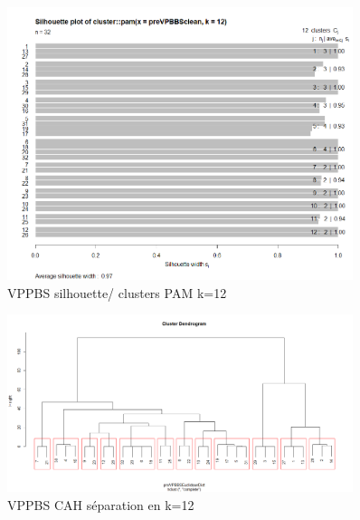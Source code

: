 \begin{figure}[H]
\centering
\includegraphics[width=0.90\textwidth]{../Fig/VPPBS/vppbs-sil-k12-pre.png}
\caption{VPPBS silhouette/ clusters PAM k=12 }
\end{figure}

\begin{figure}[H]
\centering
\includegraphics[width=0.90\textwidth]{../Fig/VPPBS/vppbs-cah-k12-pre.png}
\caption{VPPBS CAH séparation en k=12 }
\end{figure}


%
%








